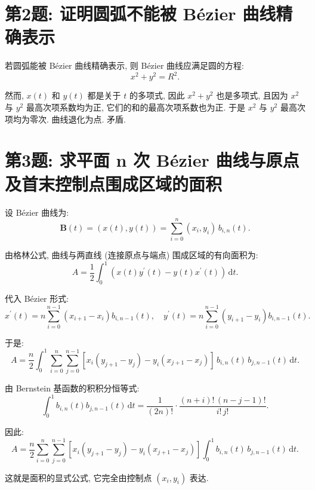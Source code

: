 \documentclass{article}
\begin{document}
    \section*{第2题: 证明圆弧不能被 Bézier 曲线精确表示}
        若圆弧能被 Bézier 曲线精确表示, 则 Bézier 曲线应满足圆的方程:
        \begin{equation*}
            x^{2} + y^{2} = R^{2}.
        \end{equation*}

        然而, $x\left(t\right)$ 和 $y\left(t\right)$ 都是关于 $t$ 的多项式, 因此 $x^{2} + y^{2}$ 也是多项式, 且因为 $x^{2}$ 与 $y^{2}$ 最高次项系数均为正, 它们的和的最高次项系数也为正. 于是 $x^{2}$ 与 $y^{2}$ 最高次项均为零次. 曲线退化为点. 矛盾.

    \section*{第3题: 求平面 n 次 Bézier 曲线与原点及首末控制点围成区域的面积}
        设 Bézier 曲线为:
        \begin{equation*}
            \mathbf{B}\left(t\right) = \left(x\left(t\right), y\left(t\right)\right) = \sum_{i=0}^{n} \left(x_{i}, y_{i}\right) \, b_{i,n}(t).
        \end{equation*}

        由格林公式, 曲线与两直线 (连接原点与端点) 围成区域的有向面积为:
        \begin{equation*}
            A = \frac{1}{2}\int_{0}^{1} \left( x\left(t\right)y^{\prime}\left(t\right) - y\left(t\right)x^{\prime}\left(t\right) \right) \, \text{d}t.
        \end{equation*}

        代入 Bézier 形式:
        \begin{equation*}
            x^{\prime}\left(t\right) = n \sum_{i=0}^{n-1} (x_{i+1}-x_{i}) b_{i,n-1}\left(t\right), \quad
            y^{\prime}\left(t\right) = n \sum_{i=0}^{n-1} (y_{i+1}-y_{i}) b_{i,n-1}\left(t\right).
        \end{equation*}

        于是:
        \begin{equation*}
            A = \frac{n}{2}\int_{0}^{1} \sum_{i=0}^{n}\sum_{j=0}^{n-1} \left[x_{i}\left(y_{j+1}-y_{j}\right) - y_{i}(x_{j+1}-x_{j})\right] \, b_{i,n}\left(t\right) \, b_{j,n-1}\left(t\right) \, \text{d}t.
        \end{equation*}

        由 Bernstein 基函数的积积分恒等式:
        \begin{equation*}
            \int_{0}^{1} b_{i,n}\left(t\right) b_{j,n-1}\left(t\right) \, \text{d}t = \frac{1}{\left(2n\right)!} \cdot \frac{\left(n+i\right)! \, \left(n-j-1\right)!}{i! \, j!}.
        \end{equation*}

        因此:
        \begin{equation*}
        A = \frac{n}{2} \sum_{i=0}^{n}\sum_{j=0}^{n-1} \left[x_{i}\left(y_{j+1} - y_{j}\right) - y_{i}\left(x_{j+1} - x_{j}\right)\right] \int_{0}^{1} b_{i,n}\left(t\right) \, b_{j,n-1}(t) \, \text{d}t.
        \end{equation*}

        这就是面积的显式公式, 它完全由控制点 $(x_i,y_i)$ 表达.
\end{document}
